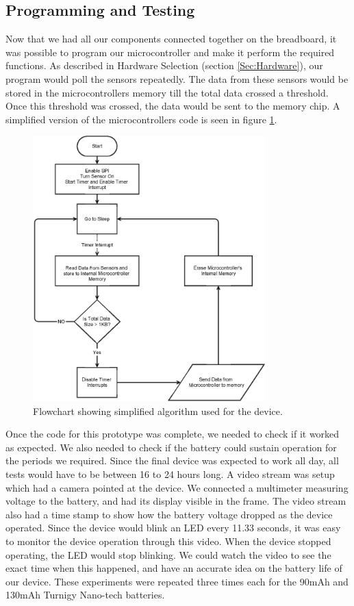 \subsection{Programming and Testing}
\label{Sec:Programming}
Now that we had all our components connected together on the breadboard,
it was possible to program our microcontroller and make it perform the required functions.
As described in Hardware Selection (section \ref{Sec:Hardware}),
our program would poll the sensors repeatedly.
The data from these sensors would be stored in the microcontrollers memory till the total data crossed a threshold.
Once this threshold was crossed, the data would be sent to the memory chip.
A simplified version of the microcontrollers code is seen in figure \ref{Fig:MainAlgo}.
\begin{figure}
\begin{center}
\includegraphics[width=0.8\textwidth]{images/MainAlgo.eps}
\caption{Flowchart showing simplified algorithm used for the device.}
\label{Fig:MainAlgo}
\end{center}
\end{figure}
Once the code for this prototype was complete, we needed to check if it worked as expected.
We also needed to check if the battery could sustain operation for the periods we required.
Since the final device was expected to work all day,
all tests would have to be between 16 to 24 hours long.
A video stream was setup which had a camera pointed at the device.
We connected a multimeter measuring voltage to the battery,
and had its display visible in the frame.
The video stream also had a time stamp to show how the battery voltage dropped as the device operated.
Since the device would blink an LED every 11.33 seconds,
it was easy to monitor the device operation through this video.
When the device stopped operating,
the LED would stop blinking.
We could watch the video to see the exact time when this happened,
and have an accurate idea on the battery life of our device.
These experiments were repeated three times each for the 90mAh and 130mAh Turnigy Nano-tech batteries.

